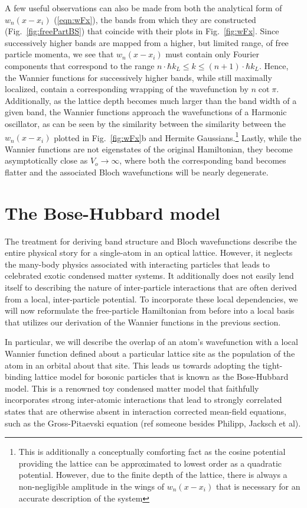 A few useful observations can also be made from both the analytical form of $w_n(x-x_i)$ (\ref{eqn:wFx}), the bands from which they are constructed (Fig.~\ref{fig:freePartBS}) that coincide with their plots in Fig.~\ref{fig:wFx}. Since successively higher bands are mapped from a higher, but limited range, of free particle momenta, we see that $w_n(x-x_i)$ must contain only Fourier components that correspond to the range $n \cdot \hbar k_L \leq k \leq (n+1) \cdot \hbar k_L$. Hence, the Wannier functions for successively higher bands, while still maximally localized, contain a corresponding wrapping of the wavefunction by $n \cot \pi$. Additionally, as the lattice depth becomes much larger than the band width of a given band, the Wannier functions approach the wavefunctions of a Harmonic oscillator, as can be seen by the similarity between the similarity between the $w_n(x-x_i)$ plotted in Fig.~\ref{fig:wFx}b and Hermite Gaussians.\footnote{This is additionally a conceptually comforting fact as the cosine potential providing the lattice can be approximated to lowest order as a quadratic potential. However, due to the finite depth of the lattice, there is always a non-negligible amplitude in the wings of $w_n(x-x_i)$ that is necessary for an accurate description of the system} Lastly, while the Wannier functions are not eigenstates of the original Hamiltonian, they become asymptotically close as $V_o \rightarrow \infty$, where both the corresponding band becomes flatter and the associated Bloch wavefunctions will be nearly degenerate.

\section{The Bose-Hubbard model}

The treatment for deriving band structure and Bloch wavefunctions describe the entire physical story for a single-atom in an optical lattice. However, it neglects the many-body physics associated with interacting particles that leads to celebrated exotic condensed matter systems. It additionally does not easily lend itself to describing the nature of inter-particle interactions that are often derived from a local, inter-particle potential. To incorporate these local dependencies, we will now reformulate the free-particle Hamiltonian from before into a local basis that utilizes our derivation of the Wannier functions in the previous section.

In particular, we will describe the overlap of an atom's wavefunction with a local Wannier function defined about a particular lattice site as the population of the atom in an orbital about that site. This leads us towards adopting the tight-binding lattice model for bosonic particles that is known as the Bose-Hubbard model. This is a renowned toy condensed matter model that faithfully incorporates strong inter-atomic interactions that lead to strongly correlated states that are otherwise absent in interaction corrected mean-field equations, such as the Gross-Pitaevski equation (ref someone besides Philipp, Jacksch et al). 

